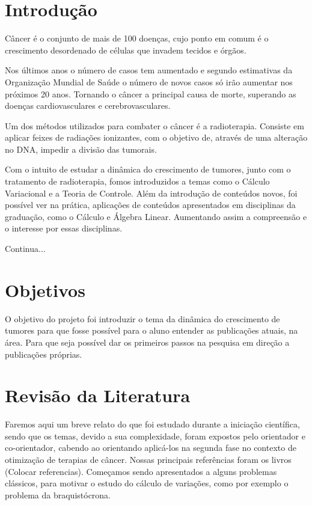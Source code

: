 \documentclass[12pt, a4paper]{article}
\makeatletter
\renewcommand\tableofcontents{
  \null\hfill\textbf{\Large\contentsname}\hfill\null\par
  \@mkboth{\MakeUppercase\contentsname}{\MakeUppercase\contentsname}
  \@starttoc{toc}
}
\makeatother
\begin{document}
 
 \begin{flushleft}
 
\tableofcontents 


\end{flushleft}
\newpage

\section{ Introdução}

Câncer é o conjunto de mais de 100 doenças, cujo ponto em comum é o crescimento desordenado de células que invadem tecidos e órgãos.\

Nos últimos anos o número de casos tem aumentado e segundo estimativas da Organização Mundial de Saúde o número de novos casos só irão aumentar nos próximos 20 anos. Tornando o câncer a principal causa de morte, superando as doenças cardiovasculares e cerebrovasculares. \

Um dos métodos utilizados para combater o câncer é a radioterapia. Consiste em aplicar feixes de radiações ionizantes, com o objetivo de, através de uma alteração no DNA, impedir a divisão das  tumorais.\

Com o intuito de estudar a dinâmica do crescimento de tumores, junto com o tratamento de radioterapia, fomos introduzidos a temas como o Cálculo Variacional e a Teoria de Controle. Além da introdução de conteúdos novos, foi possível ver na prática, aplicações de conteúdos apresentados em disciplinas da graduação, como o Cálculo e Álgebra Linear. Aumentando assim a compreensão e o interesse por essas disciplinas.\

Continua...

\newpage

\section{Objetivos}
O objetivo do projeto foi introduzir o tema da dinâmica do crescimento de tumores para que fosse possível para o aluno entender as publicações atuais, na área. Para que seja possível dar os primeiros passos na pesquisa em direção a publicações próprias.

\newpage

\section{Revisão da Literatura}

Faremos aqui um breve relato do que foi estudado durante a iniciação científica, sendo que os temas, devido a sua complexidade, foram expostos pelo orientador e  co-orientador, cabendo ao orientando aplicá-los na segunda fase no contexto de otimização de terapias de câncer. Nossas principais referências foram os livros (Colocar referencias).
Começamos sendo apresentados a alguns problemas clássicos, para motivar o estudo do cálculo de variações, como por exemplo o problema da braquistócrona.
\end{document}
